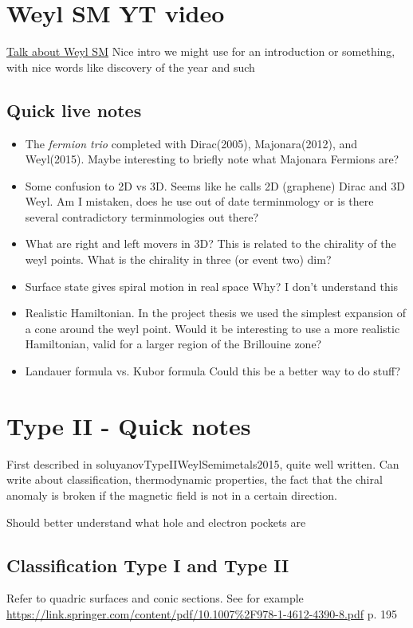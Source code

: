 \documentclass[11pt]{article}
\begin{document}
\section{Weyl SM YT video}
\label{sec:org7941e69}
\href{https://youtube.com/watch?v=Du5z7NEYYDw}{Talk about Weyl SM}
Nice intro we might use for an introduction or something, with nice words like discovery of the year and such

\subsection{Quick live notes}
\label{sec:orga34b071}
\begin{itemize}
\item The \emph{fermion trio} completed with Dirac(2005), Majonara(2012), and Weyl(2015).
Maybe interesting to briefly note what Majonara Fermions are?
\item Some confusion to 2D vs 3D. Seems like he calls 2D (graphene) Dirac and 3D Weyl.
Am I mistaken, does he use out of date terminmology or is there several contradictory terminmologies out there?
\item What are right and left movers in 3D?
This is related to the chirality of the weyl points. What is the chirality in three (or event two) dim? \label{dim_discussion}
\item Surface state gives spiral motion in real space
Why? I don't understand this
\item Realistic Hamiltonian.
In the project thesis we used the simplest expansion of a cone around the weyl point.
Would it be interesting to use a more realistic Hamiltonian, valid for a larger region of the Brillouine zone?
\item Landauer formula vs. Kubor formula
Could this be a better way to do stuff?
\end{itemize}


\section{Type II - Quick notes}
\label{sec:org58a78a6}
First described in soluyanovTypeIIWeylSemimetals2015, quite well written.
Can write about classification, thermodynamic properties, the fact that the chiral anomaly is broken if the magnetic field is not in a certain direction.

Should better understand what hole and electron pockets are

\subsection{Classification Type I and Type II}
\label{sec:orgbcd00f2}
Refer to quadric surfaces and conic sections.
See for example \url{https://link.springer.com/content/pdf/10.1007\%2F978-1-4612-4390-8.pdf} p. 195
\end{document}
